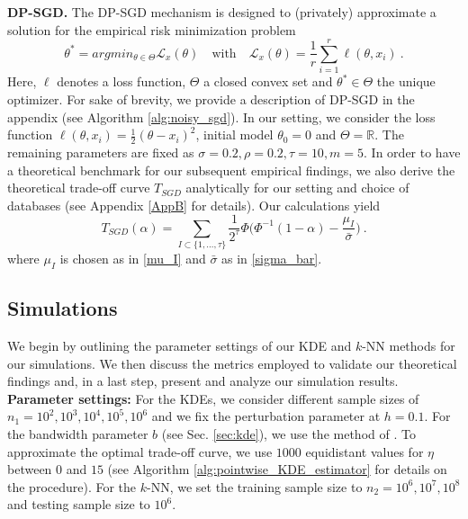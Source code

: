 \noindent \textbf{DP-SGD.} The DP-SGD mechanism is designed to (privately) approximate a solution for the empirical risk minimization problem
\begin{equation*}
\theta^*=argmin_{\theta\in \Theta} \mathcal L_x(\theta) \quad \text{with} \quad \mathcal L_x(\theta)=\frac{1}{r}\sum_{i=1}^{r} \ell(\theta, x_i)~.
\end{equation*}
Here, $\ell$ denotes a loss function, $\Theta$ a closed convex set and $\theta^*\in \Theta$ the unique optimizer. For sake of brevity, we provide a description of DP-SGD in the appendix (see Algorithm \ref{alg:noisy_sgd}). In our setting, we consider the loss function $\ell(\theta, x_i)=\frac{1}{2} (\theta-x_i)^2$, initial model $\theta_0=0$ and $\Theta=\mathbb{R}$. The remaining parameters are fixed as $\sigma=0.2, \rho = 0.2, \tau = 10, m=5$. In order to have a theoretical benchmark for our subsequent empirical findings, we also derive the theoretical trade-off curve $T_{SGD}$ analytically for our setting and choice of databases (see Appendix \ref{AppB} for details). Our calculations yield
\begin{equation*}
    T_{SGD}(\alpha)=\sum_{I\subset \{1,\hdots, \tau \}} \frac{1}{2^{\tau}}\Phi\Big(\Phi^{-1} (1-\alpha)-\frac{\mu_I}{\bar\sigma}\Big)~.
\end{equation*}
where $\mu_I$ is chosen as in \eqref{mu_I} and $\bar{\sigma}$ as in \eqref{sigma_bar}.

\subsection{Simulations}
We begin by outlining the parameter settings of our KDE and $k$-NN methods for our simulations. We then discuss the metrics employed to validate our theoretical findings and, in a last step, present and analyze our simulation results.\\
\textbf{Parameter settings:}
For the KDEs, we consider different sample sizes of $n_1=10^2,10^3,10^4,10^5,10^6$ and we fix the perturbation parameter at $h=0.1$. For the bandwidth parameter $b$ (see Sec. \ref{sec:kde}), we use the method of \cite{bandwidth}. To approximate the optimal trade-off curve, we use $1000$ equidistant values for $\eta$ between $0$ and $15$ (see Algorithm \ref{alg:pointwise_KDE_estimator} for details on the procedure). For the $k$-NN, we set the training sample size to $n_2=10^6,10^7,10^8$ and testing sample size to $10^6$. \\

